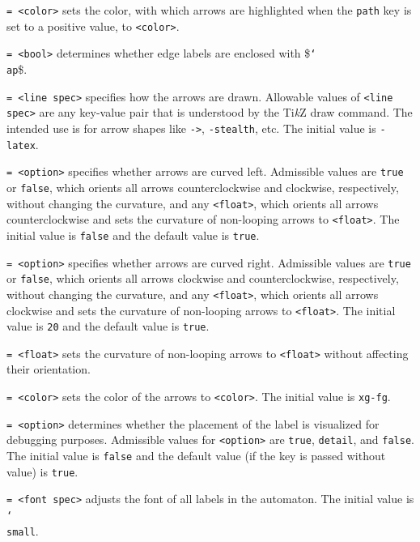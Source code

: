 \documentclass{article}
\newenvironment{desc}{\itemize[leftmargin=50pt]}{\enditemize}
\def\option#1#2{\item[\texttt{#1}] \hskip-1.5pt\texttt{#2}}
\renewcommand{\textbackslash}{\char`\\}
\def\cmd#1{\texttt{\color{cmd}\textbackslash#1}}
\def\TikZ{Ti\emph{k}Z\xspace}
\begin{document}
\begin{desc} %

\option{alert color}{= <color>} sets the color, with which arrows are highlighted when the \texttt{path} key is set to a positive value, to \texttt{<color>}.

\option{ap}{= <bool>} determines whether edge labels are enclosed with \$\cmd{ap}\$.

\option{arrow}{= <line spec>} specifies how the arrows are drawn. Allowable values of \texttt{<line spec>} are any key-value pair that is understood by the \TikZ draw command. The intended use is for arrow shapes like \texttt{->}, \texttt{-stealth}, etc. The initial value is \texttt{-latex}.

\option{bend left}{= <option>} specifies whether arrows are curved left. Admissible values are \texttt{true} or \texttt{false}, which orients all arrows counterclockwise and clockwise, respectively, without changing the curvature, and any \texttt{<float>}, which orients all arrows counterclockwise and sets the curvature of non-looping arrows to \texttt{<float>}. The initial value is \texttt{false} and the default value is \texttt{true}.

\option{bend right}{= <option>} specifies whether arrows are curved right. Admissible values are \texttt{true} or \texttt{false}, which orients all arrows clockwise and counterclockwise, respectively, without changing the curvature, and any \texttt{<float>}, which orients all arrows clockwise and sets the curvature of non-looping arrows to \texttt{<float>}. The initial value is \texttt{20} and the default value is \texttt{true}.

\option{curv}{= <float>} sets the curvature of non-looping arrows to \texttt{<float>} without affecting their orientation.

\option{color}{= <color>} sets the color of the arrows to \texttt{<color>}. The initial value is \texttt{xg-fg}.

\option{debug}{= <option>} determines whether the placement of the label is visualized for debugging purposes. Admissible values for \texttt{<option>} are \texttt{true}, \texttt{detail}, and \texttt{false}. The initial value is \texttt{false} and the default value (if the key is passed without value) is \texttt{true}.

\option{font}{= <font spec>} adjusts the font of all labels in the automaton. The initial value is \cmd{small}.


\end{desc}
\end{document}
